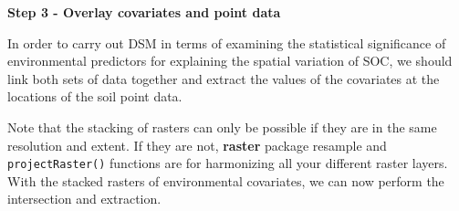 \documentclass[10pt,b5paper,]{book}
\newenvironment{Shaded}{\begin{snugshade}}{\end{snugshade}}
\newcommand{\CommentTok}[1]{\textcolor[rgb]{0.56,0.35,0.01}{\textit{#1}}}
\newcommand{\DataTypeTok}[1]{\textcolor[rgb]{0.13,0.29,0.53}{#1}}
\newcommand{\ErrorTok}[1]{\textcolor[rgb]{0.64,0.00,0.00}{\textbf{#1}}}
\newcommand{\KeywordTok}[1]{\textcolor[rgb]{0.13,0.29,0.53}{\textbf{#1}}}
\newcommand{\NormalTok}[1]{#1}
\newcommand{\OperatorTok}[1]{\textcolor[rgb]{0.81,0.36,0.00}{\textbf{#1}}}
\newcommand{\OtherTok}[1]{\textcolor[rgb]{0.56,0.35,0.01}{#1}}
\newcommand{\StringTok}[1]{\textcolor[rgb]{0.31,0.60,0.02}{#1}}
\theoremstyle{definition}
\theoremstyle{definition}
\theoremstyle{definition}
\theoremstyle{remark}
\begin{document}
\textbf{Step 3 - Overlay covariates and point data}

In order to carry out DSM in terms of examining the statistical
significance of environmental predictors for explaining the spatial
variation of SOC, we should link both sets of data together and extract
the values of the covariates at the locations of the soil point data.

Note that the stacking of rasters can only be possible if they are in
the same resolution and extent. If they are not, \textbf{raster} package
resample and \texttt{projectRaster()} functions are for harmonizing all
your different raster layers. With the stacked rasters of environmental
covariates, we can now perform the intersection and extraction.

\begin{Shaded}
\end{Shaded}
\end{document}
